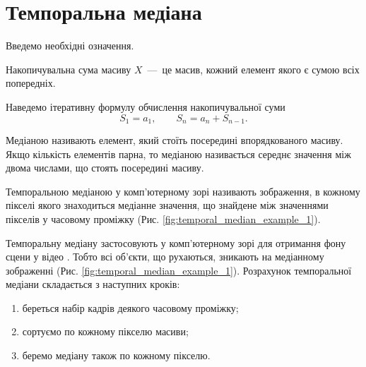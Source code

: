 \section{Темпоральна медіана}

Введемо необхідні означення.

\begin{definition}
    Накопичувальна сума масиву \cite{integral_image} $X$~---~це масив, кожний елемент якого є сумою всіх попередніх.
\end{definition}

Наведемо ітеративну формулу обчислення накопичувальної суми
\begin{equation}
    S_1 = a_1, \qquad S_n = a_n + S_{n-1}.
    \label{eq:summed_table_formula}
\end{equation}

\begin{definition}
    Медіаною \cite{median_in_statistics} називають елемент, який стоїть посередині впорядкованого масиву.
    Якщо кількість елементів парна, то медіаною називається середнє значення між двома числами,
    що стоять посередині масиву.
\end{definition}

\begin{definition}
    Темпоральною медіаною у комп'ютерному зорі називають зображення,
    в кожному пікселі якого знаходиться медіанне значення, що знайдене між значеннями пікселів у часовому проміжку
    (Рис. \ref{fig:temporal_median_example_1}).
\end{definition}

Темпоральну медіану застосовують у комп'ютерному зорі для отримання
фону сцени у відео \cite{temporal_median_example_1}.
Тобто всі об'єкти, що рухаються, зникають на медіанному зображенні
(Рис. \ref{fig:temporal_median_example_1}).
Розрахунок темпоральної медіани складається з наступних кроків:
\begin{enumerate}
    \item береться набір кадрів деякого часовому проміжку;
    \item сортуємо по кожному пікселю масиви;
    \item беремо медіану також по кожному пікселю.
\end{enumerate}

